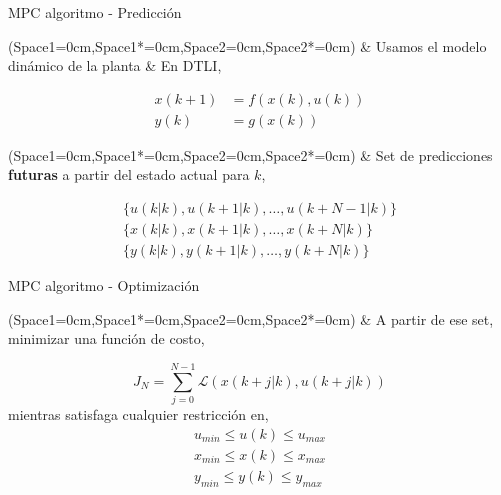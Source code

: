 \documentclass[8pt]{beamer}
\begin{document}
\begin{frame}[fragile]{MPC algoritmo - Predicción}
	\Activate
	\begin{easylist}[itemize] \ListProperties(Space1=0cm,Space1*=0cm,Space2=0cm,Space2*=0cm)
		& Usamos el modelo dinámico de la planta
		& En DTLI,
	\end{easylist}
	\Deactivate
	\begin{equation*}
	\begin{aligned}
		x(k+1) & = f(x(k),u(k)) \\
		y(k)   & = g(x(k))
	\end{aligned}
	\end{equation*}
	\Activate
	\begin{easylist}[itemize] \ListProperties(Space1=0cm,Space1*=0cm,Space2=0cm,Space2*=0cm)
		& Set de predicciones \textbf{futuras} a partir del estado actual para $k$, 	
	\end{easylist}
	\Deactivate
	\begin{equation*}
	\begin{aligned}
		\{u(k|k),u(k+1|k),\dots,u(k+N-1|k)\} \\
		\{x(k|k),x(k+1|k),\dots,x(k+N|k)\}\\
		\{y(k|k),y(k+1|k),\dots,y(k+N|k)\}
	\end{aligned}
	\end{equation*}
\end{frame}



\begin{frame}[fragile]{MPC algoritmo - Optimización}
	\Activate
	\begin{easylist}[itemize] \ListProperties(Space1=0cm,Space1*=0cm,Space2=0cm,Space2*=0cm)
		& A partir de ese set, minimizar una función de costo,
	\end{easylist}
	\Deactivate
	\begin{equation*}
		J_N = \sum_{j=0}^{N-1} \mathcal{L}( x(k+j|k), u(k+j|k) )
	\end{equation*}
	mientras satisfaga cualquier restricción en,
	\begin{equation*}
	\begin{aligned}
		u_{min}\leq u(k) \leq u_{max}\\
		x_{min}\leq x(k) \leq x_{max}\\
		y_{min}\leq y(k) \leq y_{max}\\
	\end{aligned}
	\end{equation*}
	
\end{frame}
\end{document}
